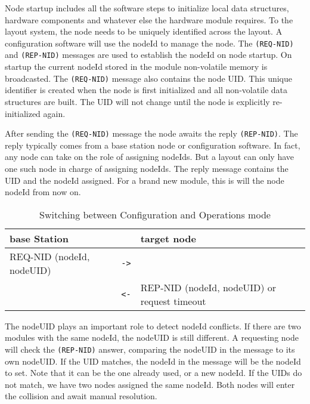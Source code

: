 Node startup includes all the software steps to initialize local data structures, hardware components and whatever else the hardware module requires. To the layout system, the node needs to be uniquely identified across the layout. A configuration software will use the nodeId to manage the node. The \texttt{(REQ-NID)} and \texttt{(REP-NID)} messages are used to establish the nodeId on node startup. On startup the current nodeId stored in the module non-volatile memory is broadcasted. The \texttt{(REQ-NID)} message also contains the node UID. This unique identifier is created when the node is first initialized and all non-volatile data structures are built. The UID will not change until the node is explicitly re-initialized again.

After sending the \texttt{(REQ-NID)} message the node awaits the reply \texttt{(REP-NID)}. The reply typically comes from a base station node or configuration software. In fact, any node can take on the role of assigning nodeIds. But a layout can only have one such node in charge of assigning nodeIds. The reply message contains the UID and the nodeId assigned. For a brand new module, this is will the node nodeId from now on.

\begin{table}[ht!]
    \begin{center}
        \caption{Switching between Configuration and Operations mode}
        \begin{tabular}{|p{}| c | p{}|}
            \toprule
            \textbf{base Station} & & \textbf{target node} \\
            \midrule
            REQ-NID (nodeId, nodeUID)  & \texttt{->} & \\
            & \texttt{<-} & REP-NID (nodeId, nodeUID) or request timeout \\
            \bottomrule
        \end{tabular}
    \end{center}
\end{table}

The nodeUID plays an important role to detect nodeId conflicts. If there are two modules with the same nodeId, the nodeUID is still different. A requesting node will check the \texttt{(REP-NID)} answer, comparing the nodeUID in the message to its own nodeUID. If the UID matches, the nodeId in the message will be the nodeId to set. Note that it can be the one already used, or a new nodeId. If the UIDs do not match, we have two nodes assigned the same nodeId. Both nodes will enter the collision and await manual resolution.

